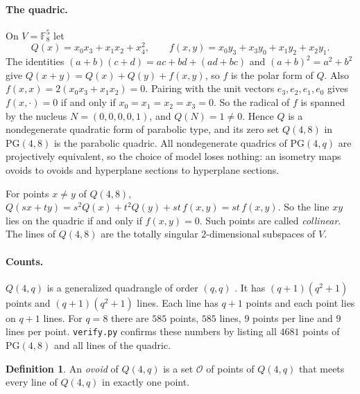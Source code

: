 \documentclass[11pt]{article}
\theoremstyle{definition}
\newtheorem{definition}[theorem]{Definition}
\theoremstyle{remark}
\newcommand{\F}{\mathbb{F}_8}
\newcommand{\pol}{f}
\begin{document}
\paragraph{The quadric.}
On $V=\F^5$ let
\[
Q(x)=x_0x_3+x_1x_2+x_4^2,\qquad
\pol(x,y)=x_0y_3+x_3y_0+x_1y_2+x_2y_1 .
\]
The identities $(a+b)(c+d)=ac+bd+(ad+bc)$ and $(a+b)^2=a^2+b^2$ give
$Q(x+y)=Q(x)+Q(y)+\pol(x,y)$, so $\pol$ is the polar form of $Q$. Also
$\pol(x,x)=2(x_0x_3+x_1x_2)=0$. Pairing with the unit vectors
$e_3,e_2,e_1,e_0$ gives $\pol(x,\cdot)=0$ if and only if
$x_0=x_1=x_2=x_3=0$. So the radical of $\pol$ is spanned by the nucleus
$N=(0,0,0,0,1)$, and $Q(N)=1\ne0$. Hence $Q$ is a nondegenerate quadratic form
of parabolic type, and its zero set $Q(4,8)$ in $\mathrm{PG}(4,8)$ is the
parabolic quadric. All nondegenerate quadrics of $\mathrm{PG}(4,q)$ are
projectively equivalent, so the choice of model loses nothing: an isometry maps
ovoids to ovoids and hyperplane sections to hyperplane sections.

For points $x\ne y$ of $Q(4,8)$,
$Q(sx+ty)=s^2Q(x)+t^2Q(y)+st\,\pol(x,y)=st\,\pol(x,y)$. So the line $xy$ lies on
the quadric if and only if $\pol(x,y)=0$. Such points are called
\emph{collinear}. The lines of $Q(4,8)$ are the totally singular
$2$-dimensional subspaces of $V$.

\paragraph{Counts.}
$Q(4,q)$ is a generalized quadrangle of order $(q,q)$ \cite[\S3.1]{PT}. It has
$(q+1)(q^2+1)$ points and $(q+1)(q^2+1)$ lines. Each line has $q+1$ points and
each point lies on $q+1$ lines. For $q=8$ there are $585$ points, $585$ lines,
$9$ points per line and $9$ lines per point. \texttt{verify.py} confirms these
numbers by listing all $4681$ points of $\mathrm{PG}(4,8)$ and all lines of the
quadric.

\begin{definition}\label{def:ovoid}
An \emph{ovoid} of $Q(4,q)$ is a set $\mathcal{O}$ of points of $Q(4,q)$ that
meets every line of $Q(4,q)$ in exactly one point.
\end{definition}
\end{document}
